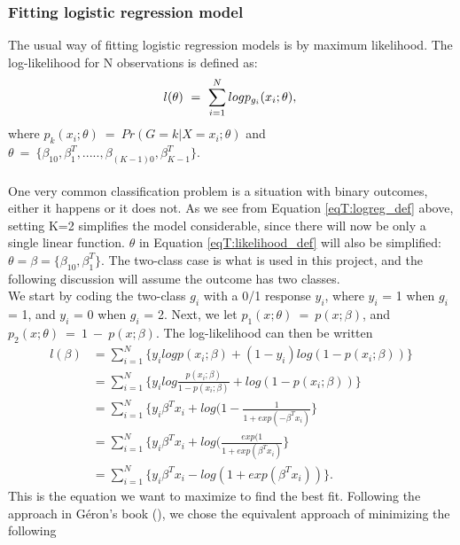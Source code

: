 \subsubsection{Fitting logistic regression model}
The usual way of fitting logistic regression models is by maximum likelihood. The log-likelihood for N observations is defined as:\\
\begin{equation}\label{eqT:likelihood_def}
l(\theta)\ =\ \sum_{i=1}^{N}logp_{g_i}(x_i;\theta),\\
\end{equation}
where $p_k(x_i;\theta)\ =\ Pr(G=k|X=x_i;\theta)$ and $\theta\ =\ \{\beta_{10}, \beta_1^T,....., \beta_{(K-1)0}, \beta_{K-1}^T\}$.\\ \\
One very common classification problem is a situation with binary outcomes, either it happens or it does not. As we see from Equation \ref{eqT:logreg_def} above, setting K=2 simplifies the model considerable, since there will now be only a single linear function. $\theta$ in Equation \ref{eqT:likelihood_def} will also be simplified: $\theta = \beta = \{\beta_{10}, \beta_1^T\}$. The two-class case is what is used in this project, and the following discussion will assume the outcome has two classes.\\
We start by coding the two-class $g_i$ with a 0/1 response $y_i$, where $y_i$ = 1 when $g_i$ = 1, and $y_i$ = 0 when $g_i$ = 2. Next, we let $p_1(x;\theta)\ =\ p(x;\beta)$, and $p_2(x;\theta)\ =\ 1\ -\ p(x;\beta)$. The log-likelihood can then be written
\begin{equation}\label{eqT:loglike_binary}
\begin{split}
l(\beta) &= \sum_{i=1}^N\{y_ilogp(x_i;\beta)+(1-y_i)log(1-p(x_i;\beta))\}\\
 &= \sum_{i=1}^N\{y_ilog\frac{p(x_i;\beta)}{1-p(x_i;\beta)}+log(1-p(x_i;\beta))\}\\
 &= \sum_{i=1}^N\{y_i\beta^Tx_i + log(1-\frac{1}{1+exp(-\beta^Tx_i)}\}\\
 &= \sum_{i=1}^N\{y_i\beta^Tx_i + log(\frac{exp(1}{1+exp(\beta^Tx_i)}\}\\
 &= \sum_{i=1}^N\{y_i\beta^Tx_i - log(1+exp(\beta^Tx_i))\}.
\end{split}
\end{equation}
This is the equation we want to maximize to find the best fit. Following the approach in Géron's book (), we chose the equivalent approach of minimizing the following\\

